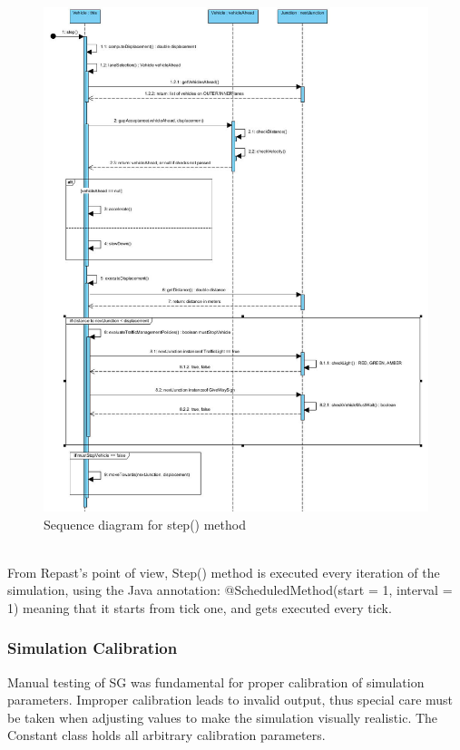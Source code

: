 \documentclass[11pt]{article}
\begin{document}
\begin{figure}
\begin{center}
\includegraphics[scale=0.45]{step_method_seq_diagram}
\caption{Sequence diagram for step() method}
\end{center}
\end{figure}

\\
From Repast\textquoteright s point of view, Step() method is executed every iteration of the simulation, using the Java annotation: @ScheduledMethod(start = 1, interval = 1) meaning that it starts from tick one, and gets executed every tick.


\subsubsection{Simulation Calibration}

Manual testing of SG was fundamental for proper calibration of simulation parameters.
Improper calibration leads to invalid output, thus special care must be taken when adjusting values to make the simulation visually realistic. The Constant class holds all arbitrary calibration parameters.
\end{document}
